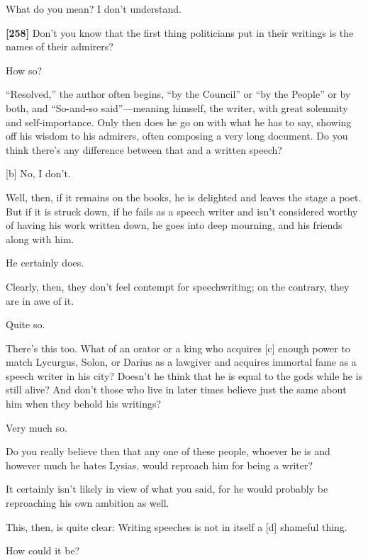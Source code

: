 \sayphaedrus What do you mean? I don't understand.

{\bf {[}258{]}} \saysocrates Don't you know that the first thing
politicians put in their
writings is the names
of their admirers?

\sayphaedrus How so?

\saysocrates “Resolved,” the author often begins, “by the Council” or “by
the People” or by both, and “So-and-so
said”---meaning
himself, the writer, with great solemnity and self-importance. Only then
does he go on with what he has to say, showing off his wisdom to his
admirers, often composing a very long document. Do you think there's any
difference between that and a written speech?

{[}b{]} \sayphaedrus No, I don't.

\saysocrates Well, then, if it remains on the books, he is delighted and
leaves the stage a poet. But if it is struck down, if he fails as a
speech writer and isn't considered worthy of having his work written
down, he goes into deep mourning, and his friends along with him.

\sayphaedrus He certainly does.

\saysocrates Clearly, then, they don't feel contempt for speechwriting; on
the contrary, they are in awe of it.

\sayphaedrus Quite so.

\saysocrates There's this too. What of an orator or a king who acquires
{[}c{]} enough power to match Lycurgus, Solon, or Darius as a
lawgiver and acquires
immortal fame as a speech writer in his city? Doesn't he think that he
is equal to the gods while he is still alive? And don't those who live
in later times believe just the same about him when they behold his
writings?

\sayphaedrus Very much so.

\saysocrates Do you really believe then that any one of these people,
whoever he is and however much he hates Lysias, would reproach him for
being a writer?

\sayphaedrus It certainly isn't likely in view of what you said, for he
would probably be reproaching his own ambition as well.

\saysocrates This, then, is quite clear: Writing speeches is not in itself
a {[}d{]} shameful thing.

\sayphaedrus How could it be?

